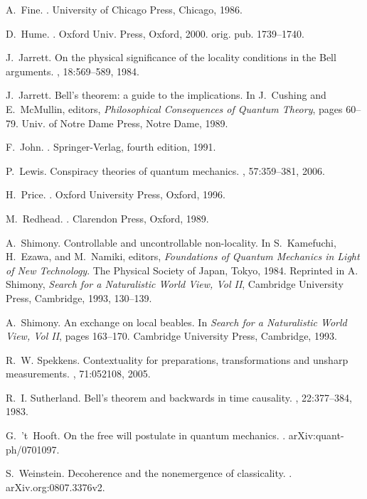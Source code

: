 \documentclass[12pt]{article}%
\begin{document}
\begin{thebibliography}{99}
A.~Fine.
.
\newblock University of Chicago Press, Chicago, 1986.

D.~Hume.
.
\newblock Oxford Univ. Press, Oxford, 2000.
\newblock orig. pub. 1739--1740.

J.~Jarrett.
\newblock On the physical significance of the locality conditions in the {B}ell
  arguments.
, 18:569--589, 1984.

J.~Jarrett.
\newblock Bell's theorem: a guide to the implications.
\newblock In J.~Cushing and E.~McMullin, editors, {\em Philosophical
  Consequences of Quantum Theory}, pages 60--79. Univ. of Notre Dame Press,
  Notre Dame, 1989.

F.~John.
.
\newblock Springer-Verlag, fourth edition, 1991.

P.~Lewis.
\newblock Conspiracy theories of quantum mechanics.
, 57:359--381,
  2006.

H.~Price.
.
\newblock Oxford University Press, Oxford, 1996.

M.~Redhead.
.
\newblock Clarendon Press, Oxford, 1989.

A.~Shimony.
\newblock Controllable and uncontrollable non-locality.
\newblock In S.~Kamefuchi, H.~Ezawa, and M.~Namiki, editors, {\em Foundations
  of Quantum Mechanics in Light of New Technology}. The Physical Society of
  Japan, Tokyo, 1984.
\newblock Reprinted in A. Shimony, \emph{Search for a Naturalistic World View,
  Vol II}, Cambridge University Press, Cambridge, 1993, 130--139.

A.~Shimony.
\newblock An exchange on local beables.
\newblock In {\em Search for a Naturalistic World View, Vol II}, pages
  163--170. Cambridge University Press, Cambridge, 1993.

R.~W. Spekkens.
\newblock Contextuality for preparations, transformations and unsharp
  measurements.
, 71:052108, 2005.

R.~I. Sutherland.
\newblock Bell's theorem and backwards in time causality.
, 22:377--384, 1983.

G.~'t~Hooft.
\newblock On the free will postulate in quantum mechanics.
.
\newblock arXiv:quant-ph/0701097.

S.~Weinstein.
\newblock Decoherence and the nonemergence of classicality.
.
\newblock arXiv.org:0807.3376v2.

\end{thebibliography}
\end{document}
